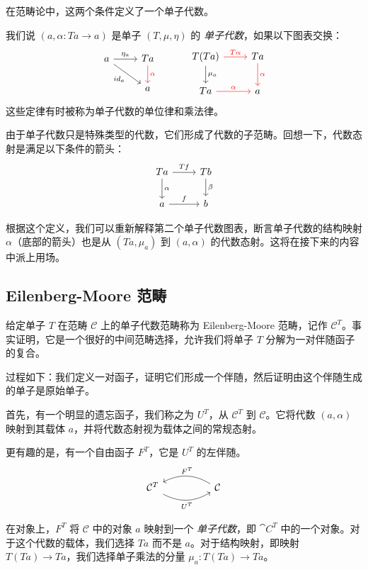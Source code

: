 \documentclass[DaoFP]{subfiles}
\begin{document}
在范畴论中，这两个条件定义了一个单子代数。

我们说 $(a, \alpha \colon T a \to a)$ 是单子 $(T, \mu, \eta)$ 的 \emph{单子代数}，如果以下图表交换：
\[
 \begin{tikzcd}
 a
 \arrow[r, "\eta_a"]
 \arrow[dr, "id_a"']
 & T a
 \arrow[d, red, "\alpha"]
 \\
 & a
 \end{tikzcd}
  \hspace{30pt}
 \begin{tikzcd}
T(T a) 
\arrow[r, red, "T \alpha "]
\arrow[d, "\mu_a"]
&T a
\arrow[d, red, "\alpha"]
\\
T a
\arrow[r, red, "\alpha"]
& a
 \end{tikzcd}
\]
这些定律有时被称为单子代数的单位律和乘法律。

由于单子代数只是特殊类型的代数，它们形成了代数的子范畴。回想一下，代数态射是满足以下条件的箭头：
\[
 \begin{tikzcd}
 T a 
 \arrow[r, "T f"]
 \arrow[d, "\alpha"]
 & T b
\arrow[d, "\beta"]
 \\
 a
 \arrow[r, "f"]
 & b
  \end{tikzcd}
\]

根据这个定义，我们可以重新解释第二个单子代数图表，断言单子代数的结构映射 $\alpha$（底部的箭头）也是从 $(T a, \mu_a)$ 到 $(a, \alpha)$ 的代数态射。这将在接下来的内容中派上用场。

\subsection{Eilenberg-Moore 范畴}

给定单子 $T$ 在范畴 $\mathcal{C}$ 上的单子代数范畴称为 Eilenberg-Moore 范畴，记作 $\mathcal{C}^T$。事实证明，它是一个很好的中间范畴选择，允许我们将单子 $T$ 分解为一对伴随函子的复合。

过程如下：我们定义一对函子，证明它们形成一个伴随，然后证明由这个伴随生成的单子是原始单子。

首先，有一个明显的遗忘函子，我们称之为 $U^T$，从 $\mathcal{C}^T$ 到 $\mathcal{C}$。它将代数 $(a, \alpha)$ 映射到其载体 $a$，并将代数态射视为载体之间的常规态射。

更有趣的是，有一个自由函子 $F^T$，它是 $U^T$ 的左伴随。
\[
 \begin{tikzcd}
   \mathcal{C}^T
    \arrow[rr, bend right, "U^T"']
&&
  \mathcal{C}
  \arrow[ll, bend right, "F^T"']
 \end{tikzcd}
\]

在对象上，$F^T$ 将 $\mathcal{C}$ 中的对象 $a$ 映射到一个 \emph{单子代数}，即 $\cat{C}^T$ 中的一个对象。对于这个代数的载体，我们选择 $T a$ 而不是 $a$。对于结构映射，即映射 $T (T a) \to T a$，我们选择单子乘法的分量 $\mu_a \colon T(T a) \to T a$。
\end{document}
